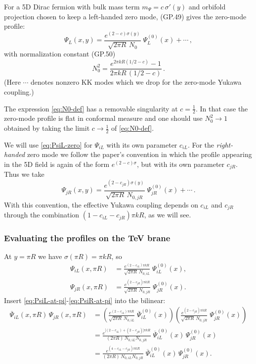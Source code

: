 \documentclass[11pt]{article}
\begin{document}
For a 5D Dirac fermion with bulk mass term $m_\Psi=c\,\sigma'(y)$ and orbifold projection chosen
to keep a left-handed zero mode, (GP.49) gives the zero-mode profile:
\begin{equation}
\Psi_L(x,y)
=
\frac{e^{(2-c)\sigma(y)}}{\sqrt{2\pi R}\,N_0}\;
\Psi^{(0)}_L(x)
+\cdots\,,
\label{eq:PsiL-zero}
\end{equation}
with normalization constant (GP.50)
\begin{equation}
N_0^2
=
\frac{e^{2\pi kR(1/2-c)}-1}{2\pi kR\,(1/2-c)}\,.
\label{eq:N0-def}
\end{equation}
(Here $\cdots$ denotes nonzero KK modes which we drop for the zero-mode Yukawa coupling.)
\begin{notationbox}
  The expression \eqref{eq:N0-def} has a removable singularity at $c=\tfrac12$.
  In that case the zero-mode profile is flat in conformal measure and one should use
  $N_0^2\to 1$ obtained by taking the limit $c\to \tfrac12$ of \eqref{eq:N0-def}.
\end{notationbox}

We will use \eqref{eq:PsiL-zero} for $\Psi_{iL}$ with its own parameter $c_{iL}$. For the \emph{right-handed} zero mode we follow the paper's convention in which the profile appearing
in the 5D field is again of the form $e^{(2-c)\sigma}$, but with its own parameter $c_{jR}$. Thus we take
\begin{equation}
\Psi_{jR}(x,y)
=
\frac{e^{(2-c_{jR})\sigma(y)}}{\sqrt{2\pi R}\,N_{0,jR}}\;
\Psi^{(0)}_{jR}(x)
+\cdots\,.
\label{eq:PsiR-zero}
\end{equation}
With this convention, the effective Yukawa coupling depends on $c_{iL}$ and $c_{jR}$ through the
combination $(1-c_{iL}-c_{jR})\pi kR$, as we will see.
\subsubsection*{Evaluating the profiles on the TeV brane}
At $y=\pi R$ we have $\sigma(\pi R)=\pi kR$, so
\begin{align}
\Psi_{iL}(x,\pi R)
&=
\frac{e^{(2-c_{iL})\pi kR}}{\sqrt{2\pi R}\,N_{0,iL}}\;
\Psi^{(0)}_{iL}(x),
\label{eq:PsiL-at-pi}
\\[4pt]
\Psi_{jR}(x,\pi R)
&=
\frac{e^{(2-c_{jR})\pi kR}}{\sqrt{2\pi R}\,N_{0,jR}}\;
\Psi^{(0)}_{jR}(x).
\label{eq:PsiR-at-pi}
\end{align}
Insert \eqref{eq:PsiL-at-pi}-\eqref{eq:PsiR-at-pi} into the bilinear:
\begin{align}
\overline{\Psi}_{iL}(x,\pi R)\,\Psi_{jR}(x,\pi R)
&=
\left(
\frac{e^{(2-c_{iL})\pi kR}}{\sqrt{2\pi R}\,N_{0,iL}}\;
\overline{\Psi}^{(0)}_{iL}(x)
\right)
\left(
\frac{e^{(2-c_{jR})\pi kR}}{\sqrt{2\pi R}\,N_{0,jR}}\;
\Psi^{(0)}_{jR}(x)
\right)
\nonumber\\[6pt]
&=
\frac{e^{\big[(2-c_{iL})+(2-c_{jR})\big]\pi kR}}{(2\pi R)\,N_{0,iL}N_{0,jR}}\;
\overline{\Psi}^{(0)}_{iL}(x)\,\Psi^{(0)}_{jR}(x)
\nonumber\\[6pt]
&=
\frac{e^{(4-c_{iL}-c_{jR})\pi kR}
}{(2\pi R)\,N_{0,iL}N_{0,jR}}\;
\overline{\Psi}^{(0)}_{iL}(x)\,\Psi^{(0)}_{jR}(x).
\label{eq:bilinear-at-pi}
\end{align}
\end{document}

